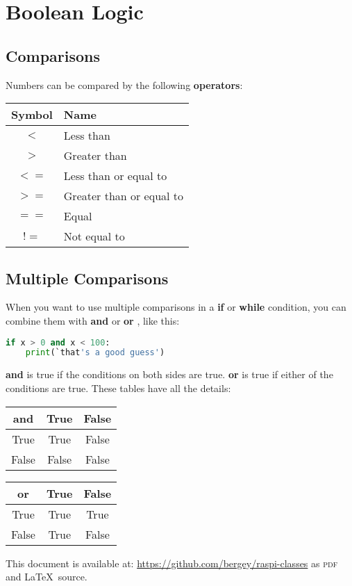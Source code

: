 \documentclass{article}
\newcommand\And{\textbf{and} }
\newcommand\Or{\textbf{or} }
\begin{document}
\section{Boolean Logic}

\subsection{Comparisons}

Numbers can be compared by the following \textbf{operators}:

\begin{center}
\begin{tabular}{c l}
  Symbol & Name \\
  \midrule
  $<$ & Less than\\
  $>$ & Greater than\\
  $<=$ & Less than or equal to\\
  $>=$ & Greater than or equal to\\
  $==$ & Equal\\
  $!=$ & Not equal to
\end{tabular}
\end{center}

\subsection{Multiple Comparisons}

When you want to use multiple comparisons in a \textbf{if} or \textbf{while} condition, you can combine them with \And or \Or, like this:

\begin{lstlisting}[language=Python]
  if x > 0 and x < 100:
    print(`that's a good guess')
\end{lstlisting}

\And is true if the conditions on both sides are true.  \Or is true if either of the conditions are true.  These tables have all the details:

\begin{center}
  \begin{tabular}{c | c c}
    \And & True & False\\
    \midrule
    True & True & False\\
    False & False & False    
  \end{tabular}
\end{center}

\begin{center}
  \begin{tabular}{c | c c}
    \Or & True & False\\
    \midrule
    True & True & True\\
    False & True & False
  \end{tabular}
\end{center}

This document is available at: \url{https://github.com/bergey/raspi-classes} as \textsc{pdf} and \LaTeX\ source.
\end{document}
